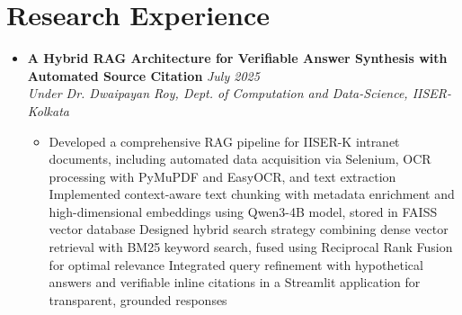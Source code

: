 \documentclass[a4paper,10pt]{article}
\newcommand{\resumeProject}[4]{
    \item\small{
        \textbf{#1} \hfill \textit{#2}\\
        \textit{#3}\\
        \begin{itemize}[leftmargin=1.5em,label=\textbullet,nosep,itemsep=0.5pt]
            #4
        \end{itemize}
    }\vspace{2pt}
}
\newcommand{\compactSection}[2]{
    \section{#1}
    \vspace{-0.1cm}
    #2
    \vspace{-0.2cm}
}
\begin{document}
\compactSection{Research Experience}{
\begin{itemize}[leftmargin=*,label={},itemsep=4pt]


    \resumeProject{A Hybrid RAG Architecture for Verifiable Answer Synthesis with Automated Source Citation}{July 2025}
    {Under Dr. Dwaipayan Roy, Dept. of Computation and Data-Science, IISER-Kolkata}
    {\item Developed a comprehensive RAG pipeline for IISER-K intranet documents, including automated data acquisition via Selenium, OCR processing with PyMuPDF and EasyOCR, and text extraction
    Implemented context-aware text chunking with metadata enrichment and high-dimensional embeddings using Qwen3-4B model, stored in FAISS vector database
     Designed hybrid search strategy combining dense vector retrieval with BM25 keyword search, fused using Reciprocal Rank Fusion for optimal relevance
    Integrated query refinement with hypothetical answers and verifiable inline citations in a Streamlit application for transparent, grounded responses}
     




\end{itemize}}
\end{document}
